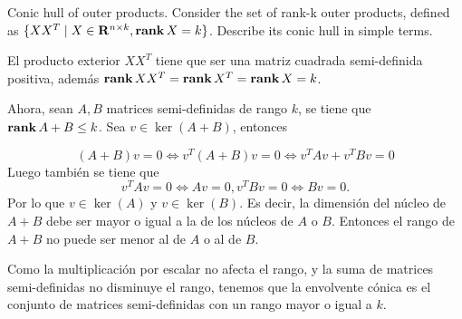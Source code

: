
\begin{enunciado}{2.13}
Conic hull of outer products. Consider the set of rank-k outer products, defined as
$\{XX^T \mid X \in \mathbf{R}^{n \times k}, \mathbf{rank}\,{X} = k\}$. Describe its conic hull in simple terms.
\end{enunciado}


El producto exterior $XX^T$ tiene que ser una matriz cuadrada semi-definida positiva,
además $\mathbf{rank}\, XX^T = \mathbf{rank}\, X^T  = \mathbf{rank}\, X = k$.

Ahora, sean $A, B$ matrices semi-definidas de rango $k$, se tiene que
$\mathbf{rank}\, A+B \leq k$.  Sea $v \in\ker(A + B)$, entonces


\[(A + B)v = 0 \iff v^T (A + B)v = 0 \iff v^T Av + v^T Bv = 0\]
Luego también se tiene que
\[v^T Av = 0 \iff Av = 0, v^T Bv = 0 \iff Bv = 0.\]
Por lo que $v\in\ker(A)$ y  $v\in\ker(B)$.
Es decir, la dimensión del núcleo de $A+B$ debe ser mayor o igual a la de los
núcleos de $A$ o $B$. Entonces el rango de $A+B$ no puede ser menor al de
$A$ o al de $B$.

Como la multiplicación por escalar no afecta el rango, y la suma de matrices
semi-definidas no disminuye el rango, tenemos que la envolvente cónica
es el conjunto de matrices semi-definidas  con un rango mayor o igual a $k$.

